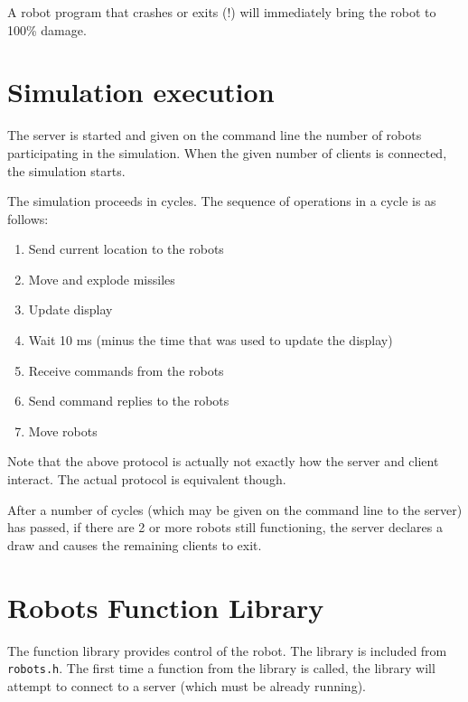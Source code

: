 \documentclass{article}
\begin{document}
        A robot program that crashes or exits (!) will immediately bring
        the robot to 100\% damage.

\section{Simulation execution}

        The server is started and given on the command line the number of
        robots participating in the simulation.  When the given number of
        clients is connected, the simulation starts.

        The simulation proceeds in cycles.  The sequence of operations in
        a cycle is as follows:
        \begin{enumerate}
        \item Send current location to the robots
        \item Move and explode missiles
        \item Update display
        \item Wait 10 ms (minus the time that was used to update the display)
        \item Receive commands from the robots
        \item Send command replies to the robots
        \item Move robots
        \end{enumerate}

        Note that the above protocol is actually not exactly
        how the server and client interact.  The actual protocol is equivalent
	though.

        After a number of cycles (which may be given on the command line
        to the server) has passed, if there are 2 or more robots still functioning,
        the server declares a draw and causes the remaining clients to exit.

\section{Robots Function Library}

        The function library provides control of the robot.  The library
        is included from \texttt{robots.h}.  The first time a function from
        the library is called, the library will attempt to connect to a server
        (which must be already running).
\end{document}
